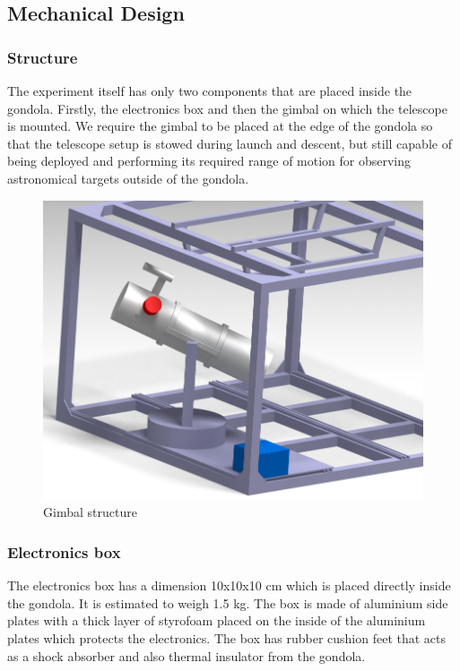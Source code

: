 \newpage
\subsection{Mechanical Design} \label{Mechanical_Design}
\label{sec:mechanical-design}

\subsubsection{Structure}
\label{sec:4.4.1}
The experiment itself has only two components that are placed inside the gondola. Firstly, the electronics box and then the gimbal on which the telescope is mounted. We require the gimbal to be placed at the edge of the gondola so that the telescope setup is stowed during launch and descent, but still capable of being deployed and performing its required range of motion for observing astronomical targets outside of the gondola.

\begin{figure}[H]
    \centering
	\includegraphics[scale=1.2]{4-experiment-design/img/mechanical/Assembly_3.png}
	\caption{Gimbal structure}
\end{figure}
\subsubsection{Electronics box}
\label{sec:4.4.2}
The electronics box has a dimension 10x10x10 cm which is placed directly inside the gondola. It is estimated to weigh 1.5 kg. The box is made of aluminium side plates with a thick layer of styrofoam placed on the inside of the aluminium plates which protects the electronics. The box has rubber cushion feet that acts as a shock absorber and also thermal insulator from the gondola.

